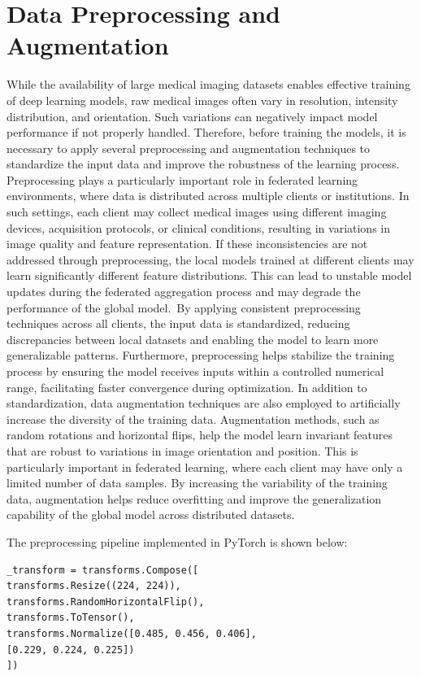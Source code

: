 \documentclass[12pt]{book}
\begin{document}
\section{Data Preprocessing and Augmentation}
While the availability of large medical imaging datasets enables effective training of deep learning models, raw medical images often vary in resolution, intensity distribution, and orientation. Such variations can negatively impact model performance if not properly handled. Therefore, before training the models, it is necessary to apply several preprocessing and augmentation techniques to standardize the input data and improve the robustness of the learning process.
Preprocessing plays a particularly important role in federated learning environments, where data is distributed across multiple clients or institutions. In such settings, each client may collect medical images using different imaging devices, acquisition protocols, or clinical conditions, resulting in variations in image quality and feature representation. If these inconsistencies are not addressed through preprocessing, the local models trained at different clients may learn significantly different feature distributions. This can lead to unstable model updates during the federated aggregation process and may degrade the performance of the global model.\
By applying consistent preprocessing techniques across all clients, the input data is standardized, reducing discrepancies between local datasets and enabling the model to learn more generalizable patterns. Furthermore, preprocessing helps stabilize the training process by ensuring the model receives inputs within a controlled numerical range, facilitating faster convergence during optimization.
In addition to standardization, data augmentation techniques are also employed to artificially increase the diversity of the training data. Augmentation methods, such as random rotations and horizontal flips, help the model learn invariant features that are robust to variations in image orientation and position. This is particularly important in federated learning, where each client may have only a limited number of data samples. By increasing the variability of the training data, augmentation helps reduce overfitting and improve the generalization capability of the global model across distributed datasets.\

The preprocessing pipeline implemented in PyTorch is shown below:

\begin{verbatim}
_transform = transforms.Compose([
transforms.Resize((224, 224)),
transforms.RandomHorizontalFlip(),
transforms.ToTensor(),
transforms.Normalize([0.485, 0.456, 0.406],
[0.229, 0.224, 0.225])
])
\end{verbatim}
\end{document}
